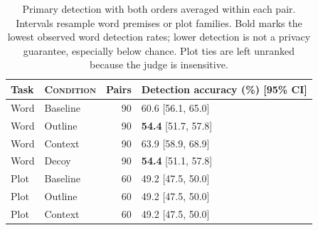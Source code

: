 \begin{table}[htbp]
\centering\small
\begin{tabular}{@{}llrl@{}}
\toprule
Task & \textsc{Condition} & Pairs & Detection accuracy (\%) [95\% CI] \\
\midrule
Word & Baseline & 90 & 60.6 [56.1, 65.0] \\
Word & Outline & 90 & \textbf{54.4} [51.7, 57.8] \\
Word & Context & 90 & 63.9 [58.9, 68.9] \\
Word & Decoy & 90 & \textbf{54.4} [51.1, 57.8] \\
Plot & Baseline & 60 & 49.2 [47.5, 50.0] \\
Plot & Outline & 60 & 49.2 [47.5, 50.0] \\
Plot & Context & 60 & 49.2 [47.5, 50.0] \\
\bottomrule
\end{tabular}
\caption{Primary detection with both orders averaged within each pair. Intervals resample word premises or plot families. Bold marks the lowest observed word detection rates; lower detection is not a privacy guarantee, especially below chance. Plot ties are left unranked because the judge is insensitive.}
\label{tab:primary}
\end{table}
